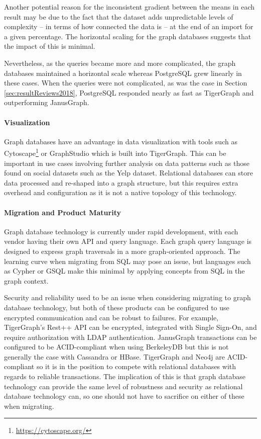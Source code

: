 Another potential reason for the inconsistent gradient between the means in each result may be due to the fact that the dataset adds unpredictable levels of complexity -- in terms of how connected the data is -- at the end of an import for a given percentage. The horizontal scaling for the graph databases suggests that the impact of this is minimal.

Nevertheless, as the queries became more and more complicated, the graph databases maintained a horizontal scale whereas PostgreSQL grew linearly in these cases. When the queries were not complicated, as was the case in Section \ref{sec:resultReviews2018},  PostgreSQL responded nearly as fast as TigerGraph and outperforming JanusGraph. 

\paragraph{Visualization}

Graph databases have an advantage in data visualization with tools such as Cytoscape\footnote{\url{https://cytoscape.org/}} or GraphStudio which is built into TigerGraph. This can be important in use cases involving further analysis on data patterns such as those found on social datasets such as the Yelp dataset. Relational databases can store data processed and re-shaped into a graph structure, but this requires extra overhead and configuration as it is not a native topology of this technology.

\paragraph{Migration and Product Maturity}

Graph database technology is currently under rapid development, with each vendor having their own API and query language. Each graph query language is designed to express graph traversals in a more graph-oriented approach. The learning curve when migrating from SQL may pose an issue, but languages such as Cypher or GSQL make this minimal by applying concepts from SQL in the graph context.

Security and reliability used to be an issue when considering migrating to graph database technology, but both of these products can be configured to use encrypted communication and can be robust to failures. For example, TigerGraph's Rest++ API can be encrypted, integrated with Single Sign-On, and require authorization with LDAP authentication. JanusGraph transactions can be configured to be ACID-compliant when using BerkeleyDB but this is not generally the case with Cassandra or HBase. TigerGraph and Neo4j are ACID-compliant so it is in the position to compete with relational databases with regards to reliable transactions. The implication of this is that graph database technology can provide the same level of robustness and security as relational database technology can, so one should not have to sacrifice on either of these when migrating.

